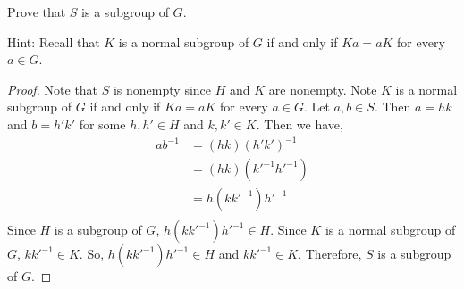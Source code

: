 \documentclass[12pt]{article}
\newenvironment{problem}[2][Problem]{\begin{trivlist}
\item[\hskip \labelsep {\bfseries #1}\hskip \labelsep {\bfseries #2.}]}{\end{trivlist}}
\begin{document}
\begin{problem}{3}
Prove that $S$ is a subgroup of $G$.

Hint: Recall that $K$ is a normal subgroup of $G$ if and only if $K a=a K$ for every $a \in G$.
\end{problem}
\begin{proof}
	Note that $S$ is nonempty since $H$ and $K$ are nonempty. 
	Note $K$ is a normal subgroup of $G$ if and only if $Ka = aK$ for every $a \in G$.
	Let $a,b \in S$. Then $a = hk$ and $b = h'k'$ for some $h,h' \in H$ and $k,k' \in K$. 
	Then we have,
	$$
	\begin{aligned}
		ab^{-1} &= (hk)(h'k')^{-1} \\
		&= (hk)(k'^{-1}h'^{-1}) \\
		&= h(kk'^{-1})h'^{-1} \\
	\end{aligned}
	$$
	Since $H$ is a subgroup of $G$, $h(kk'^{-1})h'^{-1} \in H$.
	Since $K$ is a normal subgroup of $G$, $kk'^{-1} \in K$.
	So, $h(kk'^{-1})h'^{-1} \in H$ and $kk'^{-1} \in K$.
	Therefore, $S$ is a subgroup of $G$.
\end{proof}





\end{document}

